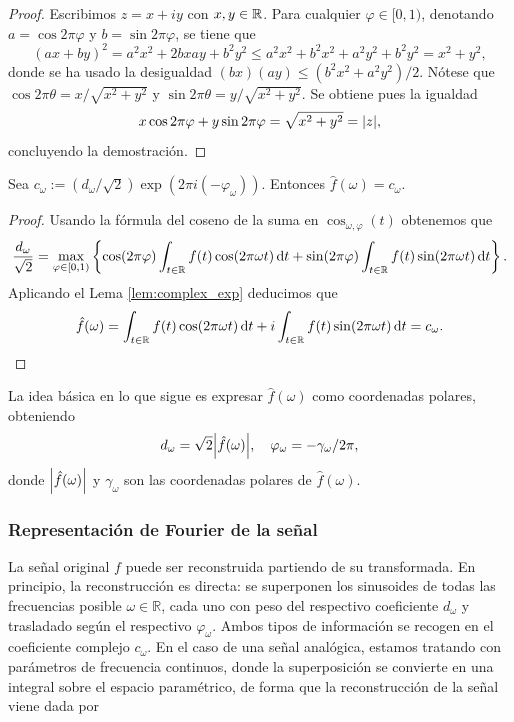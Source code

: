 \documentclass{article}
\begin{document}
\begin{proof} Escribimos $z = x + i y$ con $x,y \in \mathbb{R}$. Para cualquier $\varphi \in [0,1)$, denotando $a = \cos{2\pi\varphi}$ y $b = \sin{2\pi\varphi}$, se tiene que
\[\left(ax+by\right)^2 = a^2 x^2 + 2 b x a y + b^2 y ^2 \le a^2 x^2 + b^2 x^2 + a^2 y^2 + b^2 y^2 = x^2 + y^2,\]
donde se ha usado la desigualdad $(bx)(ay) \le (b^2x^2 + a^2y^2)/2$. Nótese que $\cos{2\pi \theta}=x/\sqrt{x^2+y^2}$ y $\sin{2\pi\theta}=y/\sqrt{x^2+y^2}$. Se obtiene pues la igualdad
\[x\cos{2\pi\varphi}+y\sin{2\pi\varphi}=\sqrt{x^2+y^2}=\abs{z},\]
concluyendo la demostración.
\end{proof}

\begin{corollary}
Sea $c_{\omega}:=(d_\omega/\sqrt{2})\exp(2\pi i(-\varphi_\omega))$. Entonces $\hat{f}(\omega)=c_{\omega}$.
\end{corollary}
\begin{proof} Usando la fórmula del coseno de la suma en $\cos_{\omega,\varphi}(t)$ obtenemos que 
\[\frac{d_\omega}{\sqrt{2}}=\max_{\varphi\in[0,1)}\left\{\cos(2\pi\varphi)\int_{t\in\mathbb{R}}f(t)\cos(2\pi\omega t)\,\mathrm{d} t + \sin(2\pi\varphi)\int_{t\in\mathbb{R}}f(t)\sin(2\pi\omega t)\,\mathrm{d} t\right\}.\]
Aplicando el Lema \ref{lem:complex_exp} deducimos que
\begin{equation*}\label{eq:fhat}
    \hat{f}(\omega)
    = \int_{t\in\mathbb{R}}f(t)\cos(2\pi\omega t)\,\mathrm{d} t + i\int_{t\in\mathbb{R}}f(t)\sin(2\pi\omega t)\,\mathrm{d} t = c_{\omega}. \qedhere
\end{equation*}
\end{proof}

La idea básica en lo que sigue es expresar $\hat{f}(\omega)$ como coordenadas polares, obteniendo 
\begin{equation}
    d_\omega=\sqrt{2}\abs{\hat{f}(\omega)}, \quad  \varphi_\omega=-\gamma_\omega/2\pi,
\end{equation}
donde $\abs{\hat{f}(\omega)}$ y $\gamma_\omega$ son las coordenadas polares de $\hat{f}(\omega)$.


\subsubsection{Representación de Fourier de la señal}

La señal original $f$ puede ser reconstruida partiendo de su transformada. En principio, la reconstrucción es directa: se superponen los sinusoides de todas las frecuencias posible $\omega\in\mathbb{R}$, cada uno con peso del respectivo coeficiente $d_\omega$ y trasladado según el respectivo $\varphi_\omega$. Ambos tipos de información se recogen en el coeficiente complejo $c_\omega$. En el caso de una señal analógica, estamos tratando con parámetros de frecuencia continuos, donde la superposición se convierte en una integral sobre el espacio paramétrico, de forma que la reconstrucción de la señal viene dada por
\end{document}

